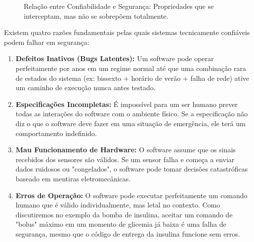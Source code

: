 \documentclass[12pt,a4paper]{report}
\begin{document}
\begin{figure}[h]
    \centering
    \caption{Relação entre Confiabilidade e Segurança: Propriedades que se interceptam, mas não se sobrepõem totalmente.}
\end{figure}

Existem quatro razões fundamentais pelas quais sistemas tecnicamente confiáveis podem falhar em segurança:

\begin{enumerate}
    \item \textbf{Defeitos Inativos (Bugs Latentes):} Um software pode operar perfeitamente por anos em um regime normal até que uma combinação rara de estados do sistema (ex: bissexto + horário de verão + falha de rede) ative um caminho de execução nunca antes testado.
    \item \textbf{Especificações Incompletas:} É impossível para um ser humano prever todas as interações do software com o ambiente físico. Se a especificação não diz o que o software deve fazer em uma situação de emergência, ele terá um comportamento indefinido.
    \item \textbf{Mau Funcionamento de Hardware:} O software assume que os sinais recebidos dos sensores são válidos. Se um sensor falha e começa a enviar dados ruidosos ou "congelados", o software pode tomar decisões catastróficas baseado em mentiras eletromecânicas.
    \item \textbf{Erros de Operação:} O software pode executar perfeitamente um comando humano que é válido individualmente, mas letal no contexto. Como discutiremos no exemplo da bomba de insulina, aceitar um comando de "bolus" máximo em um momento de glicemia já baixa é uma falha de segurança, mesmo que o código de entrega da insulina funcione sem erros.
\end{enumerate}
\end{document}
